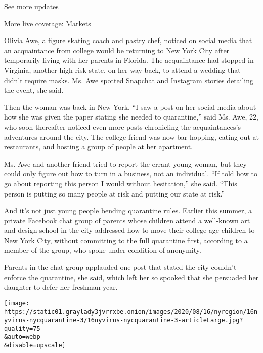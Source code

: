 \href{https://www.nytimes3xbfgragh.onion/2020/09/08/world/covid-19-coronavirus.html?action=click\&pgtype=Article\&state=default\&region=MAIN_CONTENT_1\&context=storylines_live_updates}{See
more updates}

More live coverage:
\href{https://www.nytimes3xbfgragh.onion/live/2020/09/08/business/stock-market-today-coronavirus?action=click\&pgtype=Article\&state=default\&region=MAIN_CONTENT_1\&context=storylines_live_updates}{Markets}

Olivia Awe, a figure skating coach and pastry chef, noticed on social
media that an acquaintance from college would be returning to New York
City after temporarily living with her parents in Florida. The
acquaintance had stopped in Virginia, another high-risk state, on her
way back, to attend a wedding that didn't require masks. Ms. Awe spotted
Snapchat and Instagram stories detailing the event, she said.

Then the woman was back in New York. ``I saw a post on her social media
about how she was given the paper stating she needed to quarantine,''
said Ms. Awe, 22, who soon thereafter noticed even more posts
chronicling the acquaintances's adventures around the city. The college
friend was now bar hopping, eating out at restaurants, and hosting a
group of people at her apartment.

Ms. Awe and another friend tried to report the errant young woman, but
they could only figure out how to turn in a business, not an individual.
``If told how to go about reporting this person I would without
hesitation,'' she said. ``This person is putting so many people at risk
and putting our state at risk.''

And it's not just young people bending quarantine rules. Earlier this
summer, a private Facebook chat group of parents whose children attend a
well-known art and design school in the city addressed how to move their
college-age children to New York City, without committing to the full
quarantine first, according to a member of the group, who spoke under
condition of anonymity.

Parents in the chat group applauded one post that stated the city
couldn't enforce the quarantine, she said, which left her so spooked
that she persuaded her daughter to defer her freshman year.

\texttt{[image: https://static01.graylady3jvrrxbe.onion/images/2020/08/16/nyregion/16nyvirus-nycquarantine-3/16nyvirus-nycquarantine-3-articleLarge.jpg?quality=75\\\&auto=webp\\\&disable=upscale]}


